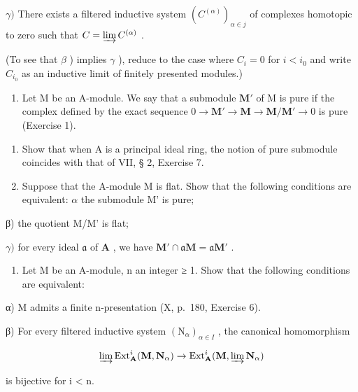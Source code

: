 \(\gamma)\) There exists a filtered inductive system \((C^{(\alpha)})_{\alpha \in j}\) of complexes homotopic to zero such that \(C = \varinjlim C^{(\alpha)}\) .

(To see that \(\beta\) ) implies \(\gamma\) ), reduce to the case where \(C_i = 0\) for \(i < i_0\) and write \(C_{i_0}\) as an inductive limit of finitely presented modules.)

\begin{enumerate}
\def\labelenumi{\arabic{enumi})}
\setcounter{enumi}{1}
\tightlist
\item
  Let M be an A-module. We say that a submodule \(\mathbf{M}'\) of M is pure if the complex defined by the exact sequence \(0 \to \mathbf{M}' \to \mathbf{M} \to \mathbf{M} / \mathbf{M}' \to 0\) is pure (Exercise 1).
\end{enumerate}

\begin{enumerate}
\def\labelenumi{\alph{enumi})}
\item
  Show that when A is a principal ideal ring, the notion of pure submodule coincides with that of VII, § 2, Exercise 7.
\item
  Suppose that the A-module M is flat. Show that the following conditions are equivalent: \(\alpha\) the submodule M' is pure;
\end{enumerate}

β) the quotient M/M' is flat;

\(\gamma)\) for every ideal \(\mathfrak{a}\) of \(\mathbf{A}\) , we have \(\mathbf{M}' \cap \mathfrak{a}\mathbf{M} = \mathfrak{a}\mathbf{M}'\) .

\begin{enumerate}
\def\labelenumi{\arabic{enumi})}
\setcounter{enumi}{2}
\tightlist
\item
  Let M be an A-module, n an integer ≥ 1. Show that the following conditions are equivalent:
\end{enumerate}

α) M admits a finite n-presentation (X, p.~180, Exercise 6).

β) For every filtered inductive system \((\mathrm{N}_{\alpha})_{\alpha\in I}\) , the canonical homomorphism

\[
\varinjlim \operatorname{Ext} _ {\mathbf {A}} ^ {i} (\mathbf {M}, \mathbf {N} _ {\alpha}) \rightarrow \operatorname{Ext} _ {\mathbf {A}} ^ {i} (\mathbf {M}, \varinjlim \mathbf {N} _ {\alpha})
\]

is bijective for i \textless{} n.

